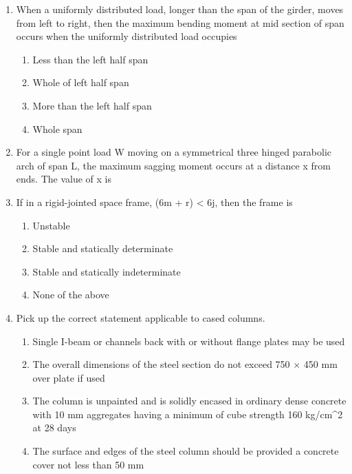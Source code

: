 \documentclass[11pt,a4paper]{article}
\begin{document}
\begin{enumerate}
\item{When a uniformly distributed load, longer than the span of the girder, moves from left to right, then the maximum bending moment at mid section of span occurs when the uniformly distributed load occupies}
\begin{enumerate}[label=\Alph*.]
\item{Less than the left half span}
\item{Whole of left half span}
\item{More than the left half span}
\item{Whole span}
\end{enumerate}
\item{For a single point load W moving on a symmetrical three hinged parabolic arch of span L, the maximum sagging moment occurs at a distance x from ends. The value of x is}
\\
\item{If in a rigid-jointed space frame, (6m + r) < 6j, then the frame is}
\begin{enumerate}[label=\Alph*.]
\item{Unstable}
\item{Stable and statically determinate}
\item{Stable and statically indeterminate}
\item{None of the above}
\end{enumerate}
\item{Pick up the correct statement applicable to cased columns.}
\begin{enumerate}[label=\Alph*.]
\item{Single I-beam or channels back with or without flange plates may be used}
\item{The overall dimensions of the steel section do not exceed 750 $\times$ 450 mm over plate if used}
\item{The column is unpainted and is solidly encased in ordinary dense concrete with 10 mm aggregates having a minimum of cube strength 160 kg/cm\^{}2 at 28 days}
\item{The surface and edges of the steel column should be provided a concrete cover not less than 50 mm}

\end{enumerate}
\end{enumerate}
\end{document}
